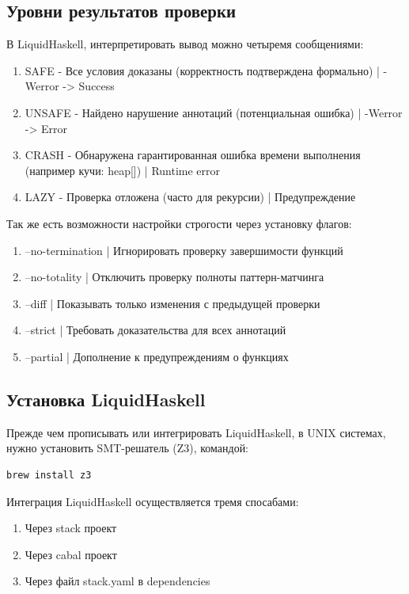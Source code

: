 \documentclass[areasetadvanced]{scrartcl}
\begin{document}
\subsection{Уровни результатов проверки}
В LiquidHaskell, интерпретировать вывод можно четыремя сообщениями:
\begin{enumerate}
    \item SAFE - Все условия доказаны (корректность подтверждена формально) | -Werror -> Success 
    \item UNSAFE - Найдено нарушение аннотаций (потенциальная ошибка) | -Werror -> Error
    \item CRASH - Обнаружена гарантированная ошибка времени выполнения (например кучи: heap[]) | Runtime error
    \item LAZY - Проверка отложена (часто для рекурсии) | Предупреждение 
\end{enumerate}
Так же есть возможности настройки строгости через установку флагов:
\begin{enumerate}
    \item --no-termination | Игнорировать проверку завершимости функций
    \item --no-totality    | Отключить проверку полноты паттерн-матчинга
    \item --diff           | Показывать только изменения с предыдущей проверки
    \item --strict         | Требовать доказательства для всех аннотаций 
    \item --partial        | Дополнение к предупреждениям о функциях 
\end{enumerate}
\subsection{Установка LiquidHaskell}
Прежде чем прописывать или интегрировать LiquidHaskell, в UNIX системах,
нужно установить SMT-решатель (Z3), командой:
\begin{lstlisting}[caption={Установка Z3 с помощью HomeBrew}, label=lst:main]
    brew install z3
\end{lstlisting}
Интеграция LiquidHaskell осуществляется тремя спосабами: 
\begin{enumerate}
    \item Через stack проект
    \item Через cabal проект 
    \item Через файл stack.yaml в dependencies 
\end{enumerate}
\newpage
\end{document}
